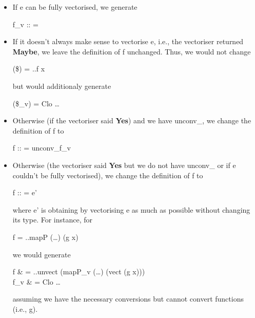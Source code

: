 \documentclass{article}
\begin{document}
\begin{itemize}
\item If \<e\> can be fully vectorised, we generate
\begin{haskell}
f_v :: \vect{\sigma} = 
\end{haskell}

\item If it doesn't always make sense to vectorise \<e\>, i.e., the vectoriser
returned \textbf{Maybe}, we leave the definition of \<f\> unchanged. Thus, we
would not change
\begin{haskell}
({\$}) = ..f x
\end{haskell}
but would additionaly generate
\begin{haskell}
({\$}_v) = Clo \ldots
\end{haskell}

\item Otherwise (if the vectoriser said \textbf{Yes}) and we have
\<unconv_\sigma\>, we change the definition of \<f\> to
\begin{haskell}
f :: \sigma = unconv_\sigma f_v
\end{haskell}

\item Otherwise (the vectoriser said \textbf{Yes} but we do not have
\<unconv_\sigma\> or if \<e\> couldn't be fully vectorised), we change the
definition of \<f\> to
\begin{haskell}
f :: \sigma = e'
\end{haskell}
where \<e'\> is obtaining by vectorising \<e\> as much as possible without
changing its type. For instance, for
\begin{haskell}
f = ..mapP (\ldots) (g x)
\end{haskell}
we would generate
\begin{haskell}
f & = ..unvect (mapP_v (\ldots) (vect (g x))) \\
f_v & = Clo \ldots
\end{haskell}
assuming we have the necessary conversions but cannot convert functions (i.e.,
\<g\>).
\end{itemize}
\end{document}
